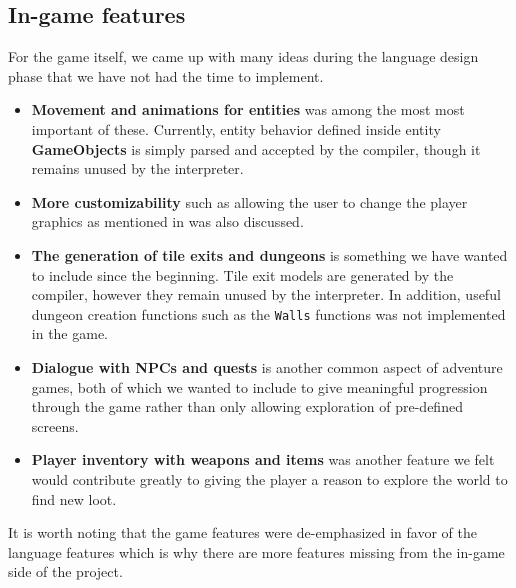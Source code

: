\subsection*{In-game features}
For the game itself, we came up with many ideas during the language design phase that we have not had the time to implement. 
\begin{itemize}
  \item
    \textbf{Movement and animations for entities} was among the most most important of these. 
    Currently, entity behavior defined inside entity \textbf{GameObjects} is simply parsed and accepted by the compiler, though it remains unused by the interpreter. 
  \item
      \textbf{More customizability} such as allowing the user to change the player graphics as mentioned in  was also discussed.
  \item 
    \textbf{The generation of tile exits and dungeons} is something we have wanted to include since the beginning. Tile exit models are generated by the compiler, however they remain unused by the interpreter. In addition, useful dungeon creation functions such as the \texttt{Walls} functions was not implemented in the game.
  \item
    \textbf{Dialogue with NPCs and quests} is another common aspect of adventure games, both of which we wanted to include to give meaningful progression through the game rather than only allowing exploration of pre-defined screens. 
  \item 
    \textbf{Player inventory with weapons and items} was another feature we felt would contribute greatly to giving the player a reason to explore the world to find new loot.
\end{itemize}

It is worth noting that the game features were de-emphasized in favor of the language features which is why there are more features missing from the in-game side of the project.